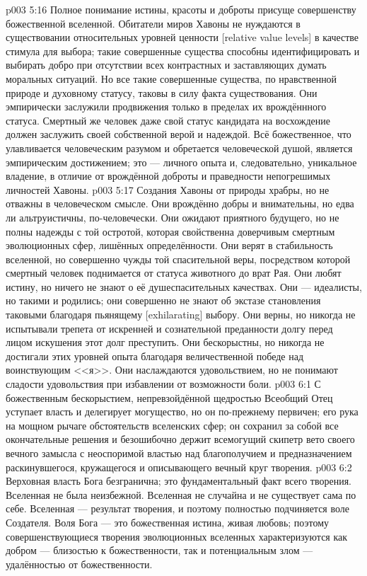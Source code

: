 \vs p003 5:16 \pc Полное понимание истины, красоты и доброты присуще совершенству божественной вселенной. Обитатели миров Хавоны не нуждаются в существовании относительных уровней ценности [relative value levels] в качестве стимула для выбора; такие совершенные существа способны идентифицировать и выбирать добро при отсутствии всех контрастных и заставляющих думать моральных ситуаций. Но все такие совершенные существа, по нравственной природе и духовному статусу, таковы в силу факта существования. Они эмпирически заслужили продвижения только в пределах их врождённного статуса. Смертный же человек даже свой статус кандидата на восхождение должен заслужить своей собственной верой и надеждой. Всё божественное, что улавливается человеческим разумом и обретается человеческой душой, является эмпирическим достижением; это ---  личного опыта и, следовательно, уникальное владение, в отличие от врождённой доброты и праведности непогрешимых личностей Хавоны.
\vs p003 5:17 \pc Создания Хавоны от природы храбры, но не отважны в человеческом смысле. Они врождённо добры и внимательны, но едва ли альтруистичны, по\hyp{}человечески. Они ожидают приятного будущего, но не полны надежды с той остротой, которая свойственна доверчивым смертным эволюционных сфер, лишённых определённости. Они верят в стабильность вселенной, но совершенно чужды той спасительной веры, посредством которой смертный человек поднимается от статуса животного до врат Рая. Они любят истину, но ничего не знают о её душеспасительных качествах. Они --- идеалисты, но такими и родились; они совершенно не знают об экстазе становления таковыми благодаря пьянящему [exhilarating] выбору. Они верны, но никогда не испытывали трепета от искренней и сознательной преданности долгу перед лицом искушения этот долг преступить. Они бескорыстны, но никогда не достигали этих уровней опыта благодаря величественной победе над воинствующим <<я>>. Они наслаждаются удовольствием, но не понимают сладости удовольствия при избавлении от возможности боли.
\vs p003 6:1 С божественным бескорыстием, непревзойдённой щедростью Всеобщий Отец уступает власть и делегирует могущество, но он по\hyp{}прежнему первичен; его рука на мощном рычаге обстоятельств вселенских сфер; он сохранил за собой все окончательные решения и безошибочно держит всемогущий скипетр вето своего вечного замысла с неоспоримой властью над благополучием и предназначением раскинувшегося, кружащегося и описывающего вечный круг творения.
\vs p003 6:2 Верховная власть Бога безгранична; это фундаментальный факт всего творения. Вселенная не была неизбежной. Вселенная не случайна и не существует сама по себе. Вселенная --- результат творения, и поэтому полностью подчиняется воле Создателя. Воля Бога --- это божественная истина, живая любовь; поэтому совершенствующиеся творения эволюционных вселенных характеризуются как добром --- близостью к божественности, так и потенциальным злом --- удалённостью от божественности.
